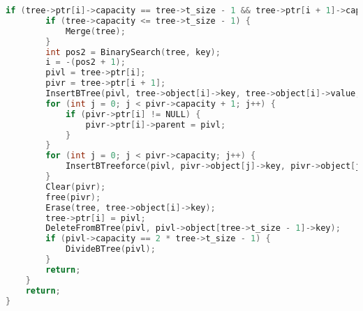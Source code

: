 \begin{lstlisting}[language=C]
    if (tree->ptr[i]->capacity == tree->t_size - 1 && tree->ptr[i + 1]->capacity == tree->t_size - 1) {
        if (tree->capacity <= tree->t_size - 1) {
            Merge(tree);
        }
        int pos2 = BinarySearch(tree, key);
        i = -(pos2 + 1);
        pivl = tree->ptr[i];
        pivr = tree->ptr[i + 1];
        InsertBTree(pivl, tree->object[i]->key, tree->object[i]->value, NULL, NULL);
        for (int j = 0; j < pivr->capacity + 1; j++) {
            if (pivr->ptr[i] != NULL) {
                pivr->ptr[i]->parent = pivl;
            }
        }
        for (int j = 0; j < pivr->capacity; j++) {
            InsertBTreeforce(pivl, pivr->object[j]->key, pivr->object[j]->value, pivr->ptr[j], pivr->ptr[j + 1]);
        }
        Clear(pivr);
        free(pivr);
        Erase(tree, tree->object[i]->key);
        tree->ptr[i] = pivl;
        DeleteFromBTree(pivl, pivl->object[tree->t_size - 1]->key);
        if (pivl->capacity == 2 * tree->t_size - 1) {
            DivideBTree(pivl);
        }
        return;
    }
    return;
}
\end{lstlisting}

